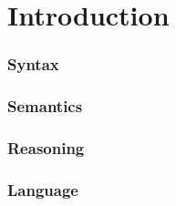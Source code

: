 \part{Introduction}
\section{Syntax}

% 

% 

% 
% 

\section{Semantics}










%
% 
% 
% 
% 
% 
\section{Reasoning}


\section{Language}


